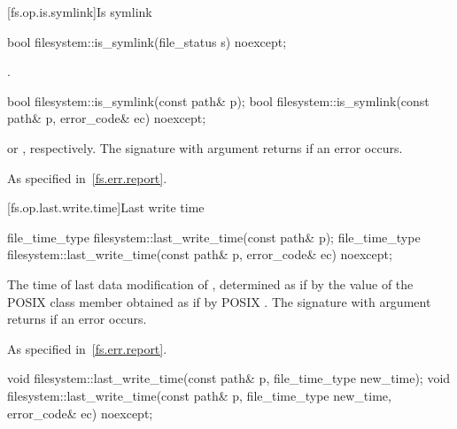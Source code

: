 [fs.op.is.symlink]{Is symlink}

%
\begin{itemdecl}
bool filesystem::is_symlink(file_status s) noexcept;
\end{itemdecl}

\begin{itemdescr}
\pnum
\returns
{}.
\end{itemdescr}

%
\begin{itemdecl}
bool filesystem::is_symlink(const path& p);
bool filesystem::is_symlink(const path& p, error_code& ec) noexcept;
\end{itemdecl}

\begin{itemdescr}
\pnum
\returns
{} or ,
  respectively. The signature with argument  returns 
  if an error occurs.

\pnum
\throws
As specified in~\ref{fs.err.report}.
\end{itemdescr}


[fs.op.last.write.time]{Last write time}

%
\begin{itemdecl}
file_time_type filesystem::last_write_time(const path& p);
file_time_type filesystem::last_write_time(const path& p, error_code& ec) noexcept;
\end{itemdecl}

\begin{itemdescr}
\pnum
\returns
The time of last data modification of ,
  determined as if by the value of the POSIX  class member 
  obtained as if by POSIX .
  The signature with argument  returns 
  if an error occurs.

\pnum
\throws
As specified in~\ref{fs.err.report}.
\end{itemdescr}

%
\begin{itemdecl}
void filesystem::last_write_time(const path& p, file_time_type new_time);
void filesystem::last_write_time(const path& p, file_time_type new_time,
                                 error_code& ec) noexcept;
\end{itemdecl}


